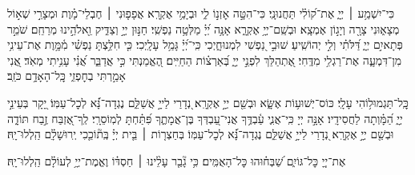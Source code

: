 \documentclass[twoside, openany, parskip=half, 11pt]{book}
\begin{document}
{		
		\begin{narrow} 
		כִּי־יִשְׁמַ֥ע ׀ יְיָ֑ אֶת־ק֝וֹלִ֗י תַּחֲנוּנָֽי׃
		כִּי־הִטָּ֣ה אׇזְנ֣וֹ לִ֑י וּבְיָמַ֥י אֶקְרָֽא׃
		אֲפָפ֤וּנִי ׀ חֶבְלֵי־מָ֗וֶת וּמְצָרֵ֣י שְׁא֣וֹל מְצָא֑וּנִי צָרָ֖ה וְיָג֣וֹן אֶמְצָֽא׃
		וּבְשֵֽׁם־יְיָ֥ אֶקְרָ֑א אָנָּ֥ה יְ֝יָ֗ מַלְּטָ֥ה נַפְשִֽׁי׃
		חַנּ֣וּן יְיָ֣ וְצַדִּ֑יק וֵ֖אלֹהֵ֣ינוּ מְרַחֵֽם׃
		שֹׁמֵ֣ר פְּתָאיִ֣ם יְיָ֑ דַּ֝לֹּתִ֗י וְלִ֣י יְהוֹשִֽׁיעַ׃
		שׁוּבִ֣י נַ֭פְשִׁי לִמְנוּחָ֑יְכִי כִּֽי־יְ֝יָ֗ גָּמַ֥ל עָלָֽיְכִי׃
		כִּ֤י חִלַּ֥צְתָּ נַפְשִׁ֗י מִ֫מָּ֥וֶת אֶת־עֵינִ֥י מִן־דִּמְעָ֑ה אֶת־רַגְלִ֥י מִדֶּֽחִי׃
		אֶ֭תְהַלֵּךְ לִפְנֵ֣י יְיָ֑ בְּ֝אַרְצ֗וֹת הַחַיִּֽים׃
		הֶ֭אֱמַנְתִּי כִּ֣י אֲדַבֵּ֑ר אֲ֝נִ֗י עָנִ֥יתִי מְאֹֽד׃
		אֲ֭נִי אָמַ֣רְתִּי בְחׇפְזִ֑י כׇּֽל־הָאָדָ֥ם כֹּזֵֽב׃
		\end{narrow}
		כׇּֽל־תַּגְמוּל֥וֹהִי עָלָֽי׃
		כּוֹס־יְשׁוּע֥וֹת אֶשָּׂ֑א וּבְשֵׁ֖ם יְיָ֣ אֶקְרָֽא׃
		נְ֭דָרַי לַייָ֣ אֲשַׁלֵּ֑ם נֶגְדָה־נָּ֗֝א לְכׇל־עַמּֽוֹ׃
		יָ֭קָר בְּעֵינֵ֣י יְיָ֑ הַ֝מָּ֗וְתָה לַחֲסִידָֽיו׃
		אָנָּ֣ה יְיָ כִּֽי־אֲנִ֢י עַ֫בְדֶּ֥ךָ אֲנִי־עַ֭בְדְּךָ בֶּן־אֲמָתֶ֑ךָ פִּ֝תַּ֗חְתָּ לְמֽוֹסֵרָֽי׃
		לְֽךָ־אֶ֭זְבַּח זֶ֣בַח תּוֹדָ֑ה וּבְשֵׁ֖ם יְיָ֣ אֶקְרָֽא׃
		נְ֭דָרַי לַייָ֣ אֲשַׁלֵּ֑ם נֶגְדָה־נָּ֗֝א לְכׇל־עַמּֽוֹ׃
		בְּחַצְר֤וֹת ׀ בֵּ֤ית יְיָ֗ בְּֽת֘וֹכֵ֤כִי יְֽרוּשָׁלָ֗‍ִם הַֽלְלוּ־יָֽהּ׃
		
		אֶת־יְיָ֭ כׇּל־גּוֹיִ֑ם שַׁ֝בְּח֗וּהוּ כׇּל־הָאֻמִּֽים׃
		כִּ֥י גָ֘בַ֤ר עָלֵ֨ינוּ ׀ חַסְדּ֗וֹ וֶאֱמֶת־יְיָ֥ לְעוֹלָ֗ם
		הַֽלְלוּ־יָֽהּ׃
		
}
\end{document}

